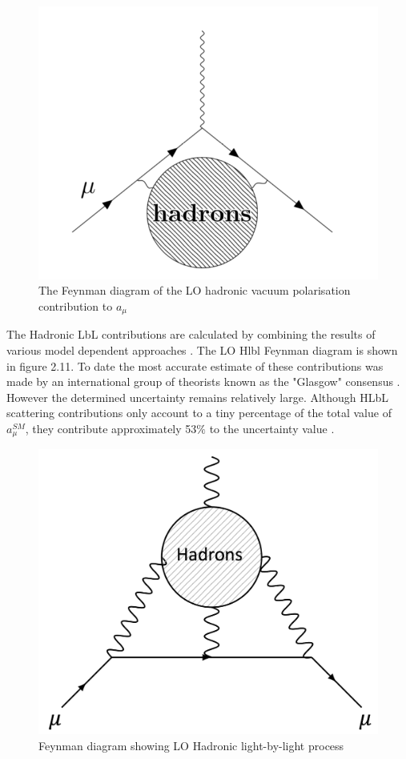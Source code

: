 \begin{figure}[th]
\centering
\includegraphics[scale=0.7]{Figures/HadHVP}
\decoRule
\caption{The Feynman diagram of the LO hadronic vacuum polarisation contribution to $a_{\mu}$}
\label{fig:HadHVP}
\end{figure}

The Hadronic LbL contributions are calculated by combining the results of various model dependent approaches \cite{Reference23}. The LO Hlbl Feynman diagram is shown in figure 2.11. To date the most accurate estimate of these contributions was made by an international group of theorists known as the "Glasgow" consensus \cite{Reference24}. However the determined uncertainty remains relatively large. Although HLbL scattering contributions only account to a tiny percentage of the total value of $a_{\mu}^{SM}$, they contribute approximately 53$\%$ to the uncertainty value \cite{Reference25}.

\begin{figure}[th]
\centering
\includegraphics[scale=0.4]{Figures/hadroniclbl.png}
\decoRule
\caption{Feynman diagram showing  LO Hadronic light-by-light process}
\label{fig:hadroniclbl}
\end{figure}

